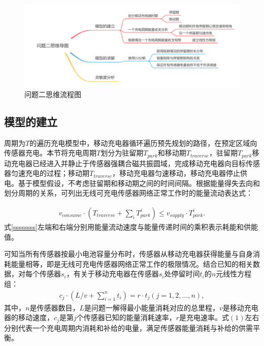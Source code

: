 \documentclass{whutmod}
\begin{document}
			\begin{figure}[H]
				\centering
				\includegraphics[width=\textwidth]{figures/222222.png}
				\caption{问题二思维流程图}\label{ssssct}

			\end{figure}
		
		\subsection{模型的建立}
			周期为$T$的遍历充电模型中，移动充电器循环遍历预先规划的路径，在预定区域向传感器充电。本节将充电周期$T$划分为驻留期$T_{park}$和移动期$T_{traverse}$，驻留期$T_{park}$移动充电器已经进入并静止于传感器强耦合磁共振圆域，完成移动充电器向目标传感器匀速充电的过程；移动期$T_{traverse}$，移动充电器匀速移动，移动充电器停止供电。基于模型假设，不考虑驻留期和移动期之间的时间间隔。根据能量得失去向和划分周期的关系，可列出无线可充电传感器网络正常工作时的能量流动表达式：

			\begin{gather}\label{ssssssss}
			v_{consume}\cdot (T_{traverse}+\sum_{i} T_{park}^i)\leq v_{supply}\cdot T_{park}^i.
			\end{gather}
			式\ref{ssssssss}左端和右端分别用能量流动速度与能量传递时间的乘积表示耗能和供能值。

			
			可知当所有传感器按最小电池容量分布时，传感器从移动充电器获得能量与自身消耗能量相等，即是无线可充电传感器网络正常工作的极限情况。结合已知的相关数据，对每个传感器$s_i$，有关于移动充电器在传感器$s_i$处停留时间$t_i$的$n$元线性方程组：
			\begin{gather}
			c_{j} \cdot (L/v+\sum_{i=1}^{n}t_i)=r \cdot t_j (j=1,2,...,n),
			\end{gather}
			其中，$n$是传感器数目，$L$是问题一解得最小能量消耗对应的总里程，$v$是移动充电器的移动速度，$c_{j}$是第$j$个传感器已知的能量消耗速率，$r$是充电速率。式$(1)$左右分别代表一个充电周期内消耗和补给的电量，满足传感器能量消耗与补给的供需平衡。
			
\end{document}
